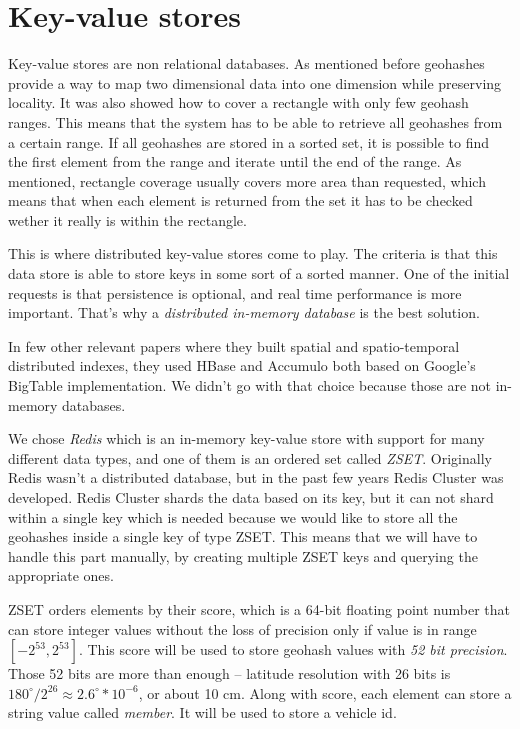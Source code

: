 \documentclass[times, utf8, diplomski]{fer}
\begin{document}
\section{Key-value stores} \label{key-value}
Key-value stores are non relational databases.
As mentioned before geohashes provide a way to map two dimensional data into one dimension while preserving locality. It was also showed how to cover a rectangle with only few geohash ranges. This means that the system has to be able to retrieve all geohashes from a certain range. If all geohashes are stored in a sorted set, it is possible to find the first element from the range and iterate until the end of the range. As mentioned, rectangle coverage usually covers more area than requested, which means that when each element is returned from the set it has to be checked wether it really is within the rectangle.

This is where distributed key-value stores come to play. The criteria is that this data store is able to store keys in some sort of a sorted manner. One of the initial requests is that persistence is optional, and real time performance is more important. That's why a \emph{distributed in-memory database} is the best solution.

In few other relevant papers where they built spatial \cite{spatialindex} and spatio-temporal \cite{spatiotemporal} distributed indexes, they used HBase and Accumulo both based on Google's BigTable implementation. We didn't go with that choice because those are not in-memory databases.

We chose \emph{Redis} which is an in-memory key-value store with support for many different data types, and one of them is an ordered set called \emph{ZSET}. Originally Redis wasn't a distributed database, but in the past few years Redis Cluster was developed. Redis Cluster shards the data based on its key, but it can not shard within a single key which is needed because we would like to store all the geohashes inside a single key of type ZSET. This means that we will have to handle this part manually, by creating multiple ZSET keys and querying the appropriate ones.

ZSET orders elements by their score, which is a 64-bit floating point number that can store integer values without the loss of precision only if value is in range $[-2^{53}, 2^{53}]$. This score will be used to store geohash values with \emph{52 bit precision}. Those 52 bits are more than enough -- latitude resolution with 26 bits is $180^{\circ}/2^{26} \approx 2.6^{\circ}*10^{-6}$, or about 10 cm. Along with score, each element can store a string value called \emph{member}. It will be used to store a vehicle id.
\end{document}
